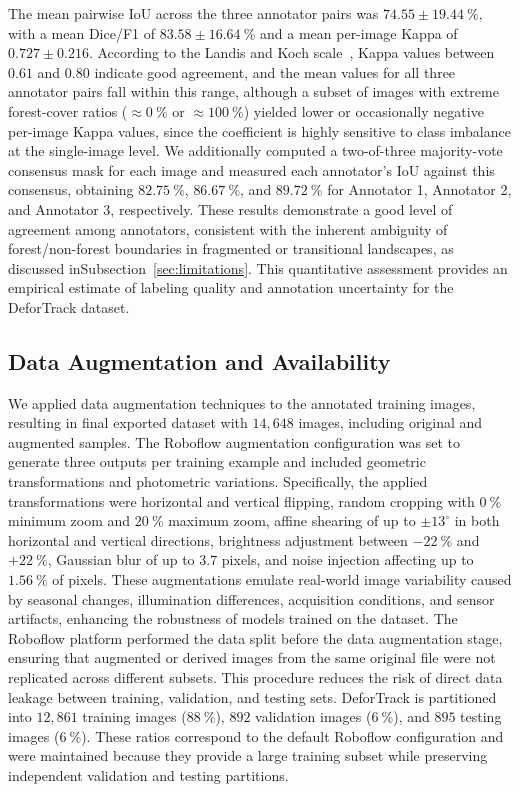 \documentclass[journal,article,submit,pdftex,moreauthors]{Definitions/mdpi}
\begin{document}
The mean pairwise IoU across the three annotator pairs was $74.55 \pm 19.44~\%$, with a mean Dice/F1 of $83.58 \pm 16.64~\%$ and a mean per-image Kappa of $0.727 \pm 0.216$. According to the Landis and Koch scale~\cite{landis1977}, Kappa values between $0.61$ and $0.80$ indicate good agreement, and the mean values for all three annotator pairs fall within this range, although a subset of images with extreme forest-cover ratios ($\approx 0~\%$ or $\approx 100~\%$) yielded lower or occasionally negative per-image Kappa values, since the coefficient is highly sensitive to class imbalance at the single-image level. We additionally computed a two-of-three majority-vote consensus mask for each image and measured each annotator's IoU against this consensus, obtaining $82.75~\%$, $86.67~\%$, and $89.72~\%$ for Annotator 1, Annotator 2, and Annotator 3, respectively. These results demonstrate a good level of agreement among annotators, consistent with the inherent ambiguity of forest/non-forest boundaries in fragmented or transitional landscapes, as discussed inSubsection~\ref{sec:limitations}. This quantitative assessment provides an empirical estimate of labeling quality and annotation uncertainty for the DeforTrack dataset.
 
\subsection{Data Augmentation and Availability}
\label{sec:data_augmentation}

We applied data augmentation techniques to the annotated training images, resulting in final exported dataset with $14,648$ images, including original and augmented samples. The Roboflow augmentation configuration was set to generate three outputs per training example and included geometric transformations and photometric variations. Specifically, the applied
transformations were horizontal and vertical flipping, random cropping with $0~\%$ minimum zoom and $20~\%$ maximum zoom, affine shearing of up to $\pm 13^{\circ}$ in both horizontal and vertical directions, brightness adjustment between $-22~\%$ and $+22~\%$, Gaussian blur of up to $3.7$ pixels, and noise injection affecting up to $1.56~\%$ of pixels. These augmentations emulate real-world image variability caused by seasonal changes, illumination differences, acquisition conditions, and sensor artifacts, enhancing the robustness of models trained on the dataset. The Roboflow platform performed the data split before the data augmentation stage, ensuring that augmented or derived images from the same original file were not replicated across different subsets. This procedure reduces the risk of direct data leakage between training, validation, and testing sets. DeforTrack is partitioned into $12,861$ training images ($88~\%$), $892$ validation images ($6~\%$), and $895$ testing images ($6~\%$). These ratios correspond to the default Roboflow configuration and were maintained because they provide a large training subset while preserving independent validation and testing partitions. 
\end{document}
